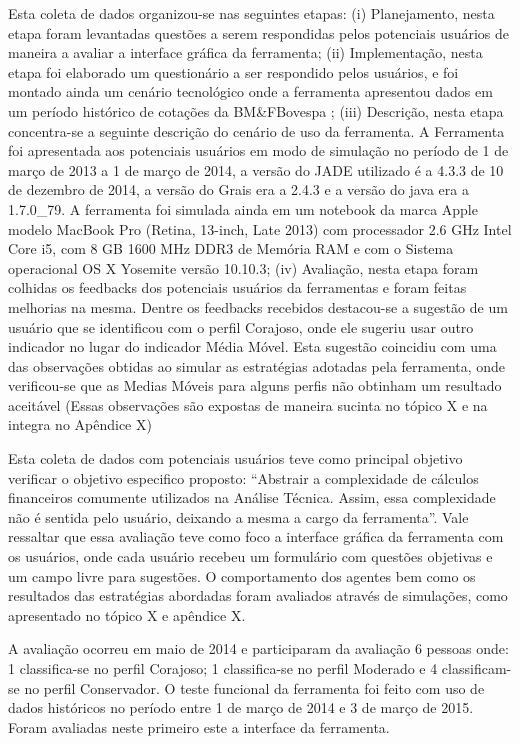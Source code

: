 Esta coleta de dados organizou-se nas seguintes etapas: (i) Planejamento, nesta etapa foram levantadas questões a serem respondidas pelos potenciais usuários de maneira a avaliar a interface gráfica da ferramenta; (ii) Implementação, nesta etapa foi elaborado um questionário a ser respondido pelos usuários, e foi montado ainda um cenário tecnológico onde a ferramenta apresentou dados em um período histórico de cotações da BM\&FBovespa ; (iii) Descrição, nesta etapa concentra-se a seguinte descrição do cenário de uso da ferramenta. A Ferramenta foi apresentada aos potenciais usuários em modo de simulação no período de 1 de março de 2013 a 1 de março de 2014, a versão do JADE utilizado é a 4.3.3 de 10 de dezembro de 2014, a versão do Grais era a 2.4.3 e a versão do java era a 1.7.0\_79. A ferramenta foi simulada ainda em um notebook da marca Apple modelo MacBook Pro (Retina, 13-inch, Late 2013) com processador 2.6 GHz Intel Core i5, com 8 GB 1600 MHz DDR3 de Memória RAM e com o Sistema operacional OS X Yosemite versão 10.10.3; (iv) Avaliação, nesta etapa foram colhidas os feedbacks dos potenciais usuários da ferramentas e foram feitas melhorias na mesma. Dentre os feedbacks recebidos destacou-se a sugestão de um usuário que se identificou com o perfil Corajoso, onde ele sugeriu usar outro indicador no lugar do indicador Média Móvel. Esta sugestão coincidiu com uma das observações obtidas ao simular as estratégias adotadas pela ferramenta, onde verificou-se que as Medias Móveis para alguns perfis não obtinham um resultado aceitável (Essas observações são expostas de maneira sucinta no tópico X e na integra no Apêndice X)


Esta coleta de dados com potenciais usuários teve como principal objetivo verificar  o objetivo especifico proposto: “Abstrair a complexidade de cálculos financeiros comumente utilizados na Análise Técnica. Assim, essa complexidade não é sentida pelo usuário, deixando a mesma a cargo da ferramenta”. Vale ressaltar que essa avaliação teve como foco a interface gráfica da ferramenta com os usuários, onde cada usuário recebeu um formulário com questões objetivas e um campo livre para sugestões. O comportamento dos agentes bem como os resultados das estratégias abordadas foram avaliados através de simulações, como apresentado no tópico X e apêndice X.


A avaliação ocorreu em maio de 2014 e participaram da avaliação 6 pessoas onde: 1 classifica-se no perfil Corajoso; 1 classifica-se no perfil Moderado e 4 classificam-se no perfil Conservador. O teste funcional da ferramenta foi feito com uso de dados históricos no período entre 1 de março de 2014 e 3 de março de 2015. Foram avaliadas neste primeiro este a interface da ferramenta.

